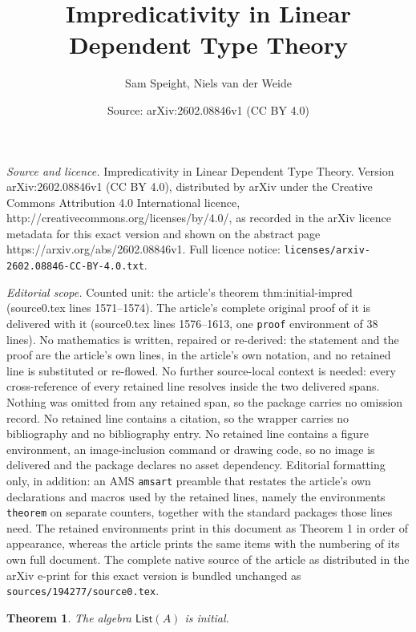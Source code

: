 \documentclass[10pt,a4paper]{amsart}
\title{Impredicativity in Linear Dependent Type Theory}
\author{Sam Speight, Niels van der Weide}
\date{Source: arXiv:2602.08846v1 (CC BY 4.0)}
\newtheorem{theorem}{Theorem}
\newcommand{\List}[1]{\mathsf{List}(#1)}
\begin{document}
\maketitle

\noindent\emph{Source and licence.} Impredicativity in Linear Dependent Type Theory. Version arXiv:2602.08846v1 (CC BY 4.0), distributed by arXiv under the Creative Commons Attribution 4.0 International licence, http://creativecommons.org/licenses/by/4.0/, as recorded in the arXiv licence metadata for this exact version and shown on the abstract page https://arxiv.org/abs/2602.08846v1. Full licence notice: \texttt{licenses/arxiv-2602.08846-CC-BY-4.0.txt}.\par\smallskip

\noindent\textit{Editorial scope.} Counted unit: the article's theorem thm:initial-impred (source0.tex lines 1571--1574). The article's complete original proof of it is delivered with it (source0.tex lines 1576--1613, one \texttt{proof} environment of 38 lines). No mathematics is written, repaired or re-derived: the statement and the proof are the article's own lines, in the article's own notation, and no retained line is substituted or re-flowed.  No further source-local context is needed: every cross-reference of every retained line resolves inside the two delivered spans.  Nothing was omitted from any retained span, so the package carries no omission record.  No retained line contains a citation, so the wrapper carries no bibliography and no bibliography entry.  No retained line contains a figure environment, an image-inclusion command or drawing code, so no image is delivered and the package declares no asset dependency.  Editorial formatting only, in addition: an AMS \texttt{amsart} preamble that restates the article's own declarations and macros used by the retained lines, namely the environments \texttt{theorem} on separate counters, together with the standard packages those lines need.  The retained environments print in this document as Theorem 1 in order of appearance, whereas the article prints the same items with the numbering of its own full document.  The complete native source of the article as distributed in the arXiv e-print for this exact version is bundled unchanged as \texttt{sources/194277/source0.tex}.
\begin{theorem}
\label{thm:initial-impred}
The algebra $\List{A}$ is initial.
\end{theorem}
\end{document}
